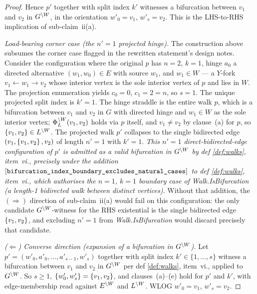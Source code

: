 \documentclass[main]{subfiles}
\begin{document}
\begin{proof}
Hence $p'$ together with split index $k'$ witnesses a bifurcation between $v_1$ and $v_2$ in $G^{\setminus W}$, in the orientation $w'_0 = v_1$, $w'_s = v_2$. This is the LHS-to-RHS implication of sub-claim~ii(a).

\emph{Load-bearing corner case (the $n' = 1$ projected hinge).}
The construction above subsumes the corner case flagged in the rewritten statement's design notes. Consider the configuration where the original $p$ has $n = 2$, $k = 1$, hinge $a_0$ a directed alternative $(w_1, w_0) \in E$ with source $w_1$, and $w_1 \in W$ --- a $Y$-fork $v_1 \leftarrow w_1 \rightarrow v_2$ whose interior vertex is the sole interior vertex of $p$ and lies in $W$. The projection enumeration yields $c_0 = 0$, $c_1 = 2 = n$, so $s = 1$. The unique projected split index is $k' = 1$. The hinge straddle is the entire walk $p$, which is a bifurcation between $v_1$ and $v_2$ in $G$ with directed hinge and $w_1 \in W$ as the sole interior vertex; $\Phi_L^{\setminus W}(v_1, v_2)$ holds via $p$ itself, and $v_1 \ne v_2$ by clause~(a) for $p$, so $\left \{ v_1, v_2 \right \} \in L^{\setminus W}$. The projected walk $p'$ collapses to the single bidirected edge $(v_1, \left \{ v_1, v_2 \right \}, v_2)$ of length $n' = 1$ with $k' = 1$. \emph{This $n' = 1$ direct-bidirected-edge configuration of $p'$ is admitted as a valid bifurcation in $G^{\setminus W}$ by def \ref{def:walks}, item~vi., precisely under the addition $[\text{\texttt{bifurcation\_index\_boundary\_excludes\_natural\_cases}}]$ to def \ref{def:walks}, item~vi., which authorises the $n = 1$, $k = 1$ boundary case of \emph{Walk.IsBifurcation} (a length-1 bidirected walk between distinct vertices).} Without that addition, the $(\Rightarrow)$ direction of sub-claim~ii(a) would fail on this configuration: the only candidate $G^{\setminus W}$-witness for the RHS existential is the single bidirected edge $\left \{ v_1, v_2 \right \}$, and excluding $n' = 1$ from \emph{Walk.IsBifurcation} would discard precisely that candidate.

\smallskip\noindent\emph{($\Leftarrow$) Converse direction (expansion of a bifurcation in $G^{\setminus W}$).}
Let $p' = (w'_0, a'_0, \dots, a'_{s-1}, w'_s)$ together with split index $k' \in \{1, \dots, s\}$ witness a bifurcation between $v_1$ and $v_2$ in $G^{\setminus W}$ per def \ref{def:walks}, item~vi., applied to $G^{\setminus W}$. So $s \ge 1$, $\left \{ w'_0, w'_s \right \} = \left \{ v_1, v_2 \right \}$, and clauses~(a)--(e) hold for $p'$ and $k'$, with edge-membership read against $E^{\setminus W}$ and $L^{\setminus W}$. WLOG $w'_0 = v_1$, $w'_s = v_2$.


\end{proof}
\end{document}
